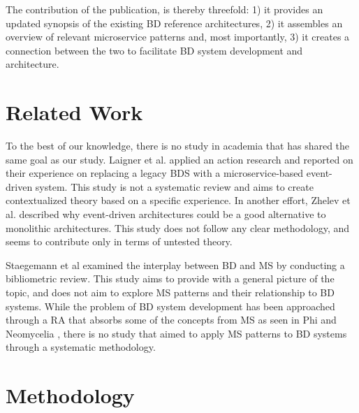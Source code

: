 \documentclass{bmcart}
\begin{document}

The contribution of the publication, is thereby threefold: 1) it provides an updated synopsis of the existing BD reference architectures, 2) it assembles an overview of relevant microservice patterns and, most importantly, 3) it creates a connection between the two to facilitate BD system development and architecture.


\section{Related Work}

To the best of our knowledge, there is no study in academia that has shared the same goal as our study. Laigner et al. \cite{laigner2020monolithic} applied an action research and reported on their experience on replacing a legacy BDS with a microservice-based event-driven system. This study is not a systematic review and aims to create contextualized theory based on a specific experience. In another effort,  Zhelev et al. \cite{zhelev2019using} described why event-driven architectures could be a good alternative to monolithic architectures. This study does not follow any clear methodology, and seems to contribute only in terms of untested theory.

Staegemann et al \cite{staegemann2021examining} examined the interplay between BD and MS by conducting a bibliometric review. This study aims to provide with a general picture of the topic, and does not aim to explore MS patterns and their relationship to BD systems.  While the problem of BD system development has been approached through a RA that absorbs some of the concepts from MS as seen in Phi \cite{Phi} and Neomycelia \cite{ataei2021neomycelia}, there is no study that aimed to apply MS patterns to BD systems through a systematic methodology.


\section{Methodology}
\end{document}
